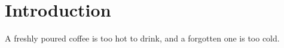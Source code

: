 \documentclass{scrartcl}
\begin{document}
\section{Introduction}
A freshly poured coffee is too hot to drink,
and a forgotten one is too cold.
\end{document}
